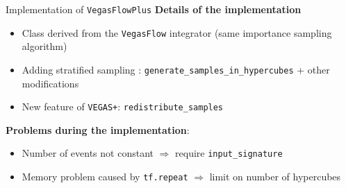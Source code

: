 \documentclass[t,handout,professionalfont,serif]{beamer}
\begin{document}
\begin{frame}{Implementation of \texttt{VegasFlowPlus}}
	\scriptsize
	\textbf{Details of the implementation}
	\begin{itemize}
		\item Class derived from the \texttt{VegasFlow} integrator (same importance sampling algorithm)
		\item Adding stratified sampling : \texttt{generate\_samples\_in\_hypercubes} + other modifications
		\item New feature of \texttt{VEGAS+}: \texttt{redistribute\_samples}
	\end{itemize}
	
	\vspace{2cm}
	
	\textbf{Problems during the implementation}:
	\begin{itemize}
		\item Number of events not constant $\Rightarrow$ require \texttt{input\_signature}
		\item Memory problem caused by \texttt{tf.repeat} $\Rightarrow$ limit on number of hypercubes
	\end{itemize}
\end{frame}

	
	
\end{document}
